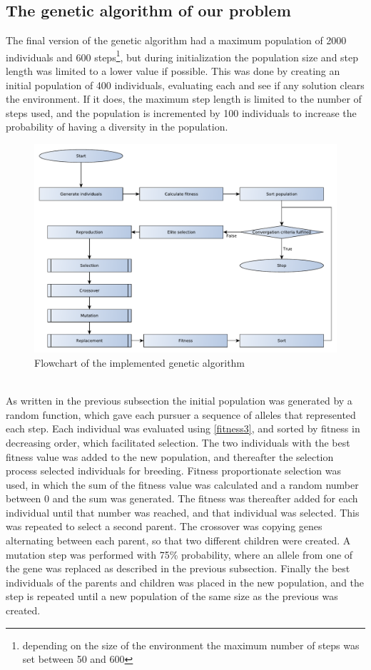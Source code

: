 \subsection{The genetic algorithm of our problem}
The final version of the genetic algorithm had a maximum population of 2000 individuals and 600 steps\footnote{depending on the size of the environment the maximum number of steps was set between 50 and 600 }, but during initialization the population size and step length was limited to a lower value if possible. This was done by creating an initial population of 400 individuals, evaluating each and see if any solution clears the environment. If it does, the maximum step length is limited to the number of steps used, and the population is incremented by 100 individuals to increase the probability of having a diversity in the population.
\begin{figure}[!h]
	\centering
	\includegraphics[width=\textwidth]{chapter_4_methods/GeneticFlowChart-Algorithm}
	\caption[Flowchart of the implemented genetic algorithm]
	{Flowchart of the implemented genetic algorithm}
	\label{GeneticFlowChart-algorithm}
\end{figure}
\\As written in the previous subsection the initial population was generated by a random function, which gave each pursuer a sequence of alleles that represented each step.
Each individual was evaluated using \eqref{fitness3}, and sorted by fitness in decreasing order, which facilitated selection.
The two individuals with the best fitness value was added to the new population, and thereafter the selection process selected individuals for breeding. Fitness proportionate selection was used, in which the sum of the fitness value was calculated and a random number between 0 and the sum was generated. The fitness was thereafter added for each individual until that number was reached, and that individual was selected. This was repeated to select a second parent. The crossover was copying genes alternating between each parent, so that two different children were created. A mutation step was performed with 75\% probability, where an allele from one of the gene was replaced as described in the previous subsection. Finally the best individuals of the parents and children was  placed in the new population, and the step is repeated until a new population of the same size as the previous was created.
